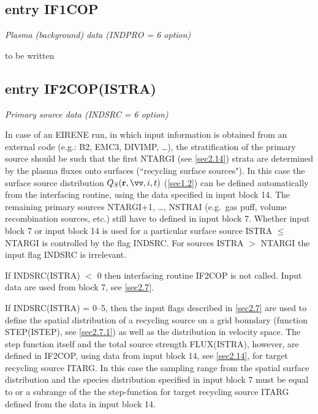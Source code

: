 \subsection{entry IF1COP} \label{sec4.1.1} 

\textsl{Plasma (background) data (INDPRO = 6 option)} 

\medskip 

to be written 

\subsection{entry IF2COP(ISTRA)} \label{sec4.1.2} 

\textsl{Primary source data (INDSRC = 6 option)} 

\medskip 

In case of an EIRENE run, in which input information is obtained from an
external code (e.g.: B2, EMC3, DIVIMP, \dots), the stratification of the
primary source should be such that the first NTARGI (see \cref{sec2.14}) strata
are determined by the plasma fluxes onto surfaces (``recycling surface
sources").
In this case the surface source distribution $Q_S(\vr,\vv,i,t)$ (\cref{sec1.2})
can be defined automatically from the interfacing routine, using the data
specified in input block 14.
The remaining primary sources NTARGI+1, \dots, NSTRAI (e.g.\ gas puff, volume
recombination sources, etc.) still have to defined in input block 7.
Whether input block 7 or input block 14 is used for a particular surface source
ISTRA $\le$ NTARGI is controlled by the flag INDSRC.
For sources ISTRA $>$ NTARGI the input flag INDSRC  is irrelevant.

If INDSRC(ISTRA) $<$ 0 then interfacing routine IF2COP is not called.
Input data are used from block 7, see \cref{sec2.7}.

\medskip

If INDSRC(ISTRA) = 0--5, then the input flags described in \cref{sec2.7} are
used to define the spatial distribution of a recycling source on a grid
boundary (function STEP(ISTEP), see \cref{sec2.7.1}) as well as the
distribution in velocity space.
The step function itself and the total source strength FLUX(ISTRA), however,
are defined in IF2COP, using data from input block 14, see \cref{sec2.14}, for
target recycling source ITARG.
In this case the sampling range from the spatial surface distribution and the
species distribution specified in input block 7 must be equal to or a subrange
of the the step-function for target recycling source ITARG defined from the
data in input block 14.

